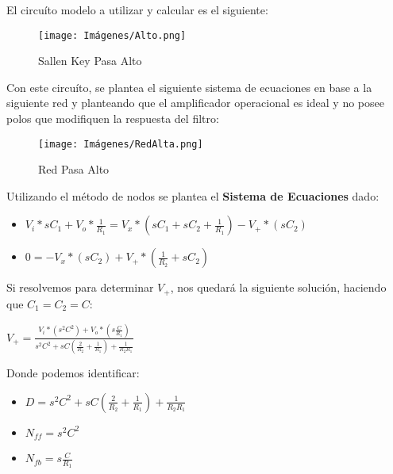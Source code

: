     \begin{center}
    \end{center}

    El circuíto modelo a utilizar y calcular es el siguiente:\\

    \begin{figure}[ht]
        \centering
        \texttt{[image: Imágenes/Alto.png]}
        \caption{Sallen Key Pasa Alto}
    \end{figure}

    Con este circuíto, se plantea el siguiente sistema de ecuaciones en base a la siguiente red y planteando que el amplificador operacional es ideal y no posee polos que modifiquen la respuesta del filtro:\\

    \begin{figure}[ht]
        \centering
        \texttt{[image: Imágenes/RedAlta.png]}
        \caption{Red Pasa Alto}
    \end{figure}

    \newpage
    Utilizando el método de nodos se plantea el \textbf{Sistema de Ecuaciones} dado:\\
    
    \begin{itemize}
        \item $V_i*sC_1 + V_o*\frac{1}{R_1} = V_x*(sC_1+sC_2+\frac{1}{R_1}) - V_+*(sC_2)$
        \item $0 = -V_x*(sC_2) +V_+*(\frac{1}{R_2} + sC_2)$
    \end{itemize}

    Si resolvemos para determinar $V_+$, nos quedará la siguiente solución, haciendo que $C_1 = C_2 = C$:\\

    \begin{center}
        $V_+ = \frac{V_i*(s^2C^2) + V_o*(s\frac{C}{R_1})}{s^2C^2 + sC(\frac{2}{R_2}+\frac{1}{R_1})+\frac{1}{R_2R_1}}$
    \end{center}

    Donde podemos identificar:\\
    
    \begin{itemize}
        \item $D = s^2C^2 + sC(\frac{2}{R_2}+\frac{1}{R_1})+\frac{1}{R_2R_1}$
        \item $N_{ff} = s^2C^2$
        \item $N_{fb} = s\frac{C}{R_1}$
    \end{itemize}

